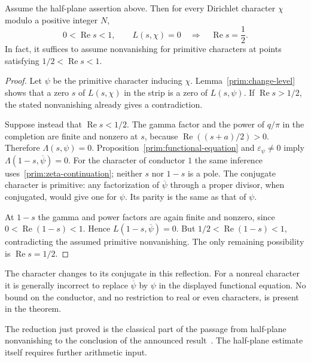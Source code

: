\begin{theorem}\label{prim:strip-reduction}
Assume the half-plane assertion above.  Then for every Dirichlet
character $\chi$ modulo a positive integer $N$,
\[
 0<\operatorname{Re}s<1,\qquad L(s,\chi)=0
 \quad\Longrightarrow\quad
 \operatorname{Re}s=\frac12.
\]
In fact, it suffices to assume nonvanishing for primitive characters at
points satisfying $1/2<\operatorname{Re}s<1$.
\end{theorem}

\begin{proof}
Let $\psi$ be the primitive character inducing $\chi$.
Lemma~\ref{prim:change-level} shows that a zero $s$ of $L(s,\chi)$ in
the strip is a zero of $L(s,\psi)$.  If
$\operatorname{Re}s>1/2$, the stated nonvanishing already gives a
contradiction.

Suppose instead that $\operatorname{Re}s<1/2$.  The gamma factor and
the power of $q/\pi$ in the completion are finite and nonzero at $s$,
because $\operatorname{Re}((s+a)/2)>0$.  Therefore
$\Lambda(s,\psi)=0$.  Proposition~\ref{prim:functional-equation} and
$\varepsilon_\psi\neq0$ imply
$\Lambda(1-s,\overline\psi)=0$.  For the character of conductor $1$
the same inference uses~\eqref{prim:zeta-continuation}; neither $s$ nor
$1-s$ is a pole.  The conjugate character is primitive: any factorization
of $\overline\psi$ through a proper divisor, when conjugated, would give
one for $\psi$.  Its parity is the same as that of $\psi$.

At $1-s$ the gamma and power factors are again finite and nonzero,
since $0<\operatorname{Re}(1-s)<1$.  Hence
$L(1-s,\overline\psi)=0$.  But
$1/2<\operatorname{Re}(1-s)<1$, contradicting the assumed primitive
nonvanishing.  The only remaining possibility is
$\operatorname{Re}s=1/2$.
\end{proof}

The character changes to its conjugate in this reflection.  For a
nonreal character it is generally incorrect to replace
$\overline\psi$ by $\psi$ in the displayed functional equation.
No bound on the conductor, and no restriction to real or even
characters, is present in the theorem.

The reduction just proved is the classical part of the passage from
half-plane nonvanishing to the conclusion of the announced
result~\cite{AlpogeSource}. The half-plane estimate itself requires
further arithmetic input.
